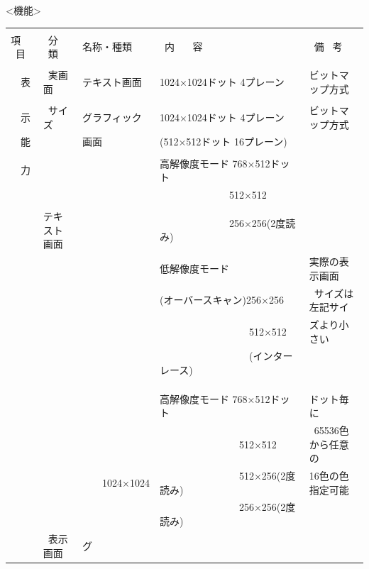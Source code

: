 \documentclass[twoside,a4paper,12pt]{article}
\begin{document}
<機能>

\setlength{\tabcolsep}{0.5mm}
\begin{tabular}{|p{13mm}|p{23mm}|p{4mm}|p{20mm}|p{65mm}|p{36mm}|}
\hline
& & \multicolumn{2}{l|}{} & &\\[-2mm]
項 \ 目& \ 分 \ 類 & \multicolumn{2}{l|}{名称・種類} & \ 内 \ \ \ 容 & \ 備 \ 考\\[1mm]
\hline
& & \multicolumn{2}{l|}{} & &\\[-1mm]
\ \ 表 & \ 実画面 & \multicolumn{2}{l|}{テキスト画面} & 1024×1024ドット 4プレーン & ビットマップ方式\\
\cline{3-6}
& & \multicolumn{2}{l|}{} & &\\[-4mm]
\ \ 示 & \ サイズ & \multicolumn{2}{l|}{グラフィック} & 1024×1024ドット 4プレーン & ビットマップ方式\\
\ \ 能 & & \multicolumn{2}{l|}{画面} & (512×512ドット 16プレーン) &\\
\cline{2-6}
& & \multicolumn{2}{l|}{} & &\\[-4mm]
\ \ 力 & & \multicolumn{2}{l|}{} & 高解像度モード 768×512ドット &\\
& & \multicolumn{2}{l|}{} & \ \ \ \ \ \ \ \ \ \ \ \ \ \ 512×512 &\\
& & \multicolumn{2}{l|}{} & &\\
& テキスト画面 & \multicolumn{2}{l|}{} & \ \ \ \ \ \ \ \ \ \ \ \ \ \ 256×256(2度読み) &\\
& & \multicolumn{2}{l|}{} & 低解像度モード & 実際の表示画面\\
& & \multicolumn{2}{l|}{} & (オーバースキャン)256×256 & \ サイズは左記サイ\\
& & \multicolumn{2}{l|}{} & \ \ \ \ \ \ \ \ \ \ \ \ \ \ \ \ \ \ 512×512 & ズより小さい\\
& & \multicolumn{2}{l|}{} & \ \ \ \ \ \ \ \ \ \ \ \ \ \ \ \ \ \ (インターレース) &\\
& & \multicolumn{2}{l|}{} & &\\
& & \multicolumn{2}{l|}{} & &\\
\cline{2-6}
& & & & &\\[-4mm]
& & & & 高解像度モード 768×512ドット & ドット毎に\\
& & & & \ \ \ \ \ \ \ \ \ \ \ \ \ \ \ \ 512×512 & \ 65536色から任意の\\
& & & 1024×1024 & \ \ \ \ \ \ \ \ \ \ \ \ \ \ \ \ 512×256(2度読み) & 16色の色指定可能\\
& & & & \ \ \ \ \ \ \ \ \ \ \ \ \ \ \ \ 256×256(2度読み) &\\
& \ 表示画面 & グ & & &\\[2mm]

\end{tabular}
\end{document}
